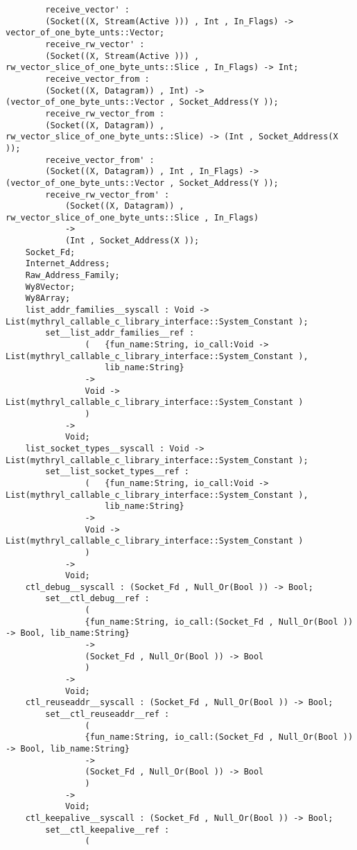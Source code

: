 \begin{verbatim}
        receive_vector' :
        (Socket((X, Stream(Active ))) , Int , In_Flags) -> vector_of_one_byte_unts::Vector;
        receive_rw_vector' :
        (Socket((X, Stream(Active ))) , rw_vector_slice_of_one_byte_unts::Slice , In_Flags) -> Int;
        receive_vector_from :
        (Socket((X, Datagram)) , Int) -> (vector_of_one_byte_unts::Vector , Socket_Address(Y ));
        receive_rw_vector_from :
        (Socket((X, Datagram)) , rw_vector_slice_of_one_byte_unts::Slice) -> (Int , Socket_Address(X ));
        receive_vector_from' :
        (Socket((X, Datagram)) , Int , In_Flags) -> (vector_of_one_byte_unts::Vector , Socket_Address(Y ));
        receive_rw_vector_from' :
            (Socket((X, Datagram)) , rw_vector_slice_of_one_byte_unts::Slice , In_Flags)
            ->
            (Int , Socket_Address(X ));
    Socket_Fd;
    Internet_Address;
    Raw_Address_Family;
    Wy8Vector;
    Wy8Array;
    list_addr_families__syscall : Void -> List(mythryl_callable_c_library_interface::System_Constant );
        set__list_addr_families__ref :
                (   {fun_name:String, io_call:Void -> List(mythryl_callable_c_library_interface::System_Constant ),
                    lib_name:String}
                ->
                Void -> List(mythryl_callable_c_library_interface::System_Constant )
                )
            ->
            Void;
    list_socket_types__syscall : Void -> List(mythryl_callable_c_library_interface::System_Constant );
        set__list_socket_types__ref :
                (   {fun_name:String, io_call:Void -> List(mythryl_callable_c_library_interface::System_Constant ),
                    lib_name:String}
                ->
                Void -> List(mythryl_callable_c_library_interface::System_Constant )
                )
            ->
            Void;
    ctl_debug__syscall : (Socket_Fd , Null_Or(Bool )) -> Bool;
        set__ctl_debug__ref :
                (
                {fun_name:String, io_call:(Socket_Fd , Null_Or(Bool )) -> Bool, lib_name:String}
                ->
                (Socket_Fd , Null_Or(Bool )) -> Bool
                )
            ->
            Void;
    ctl_reuseaddr__syscall : (Socket_Fd , Null_Or(Bool )) -> Bool;
        set__ctl_reuseaddr__ref :
                (
                {fun_name:String, io_call:(Socket_Fd , Null_Or(Bool )) -> Bool, lib_name:String}
                ->
                (Socket_Fd , Null_Or(Bool )) -> Bool
                )
            ->
            Void;
    ctl_keepalive__syscall : (Socket_Fd , Null_Or(Bool )) -> Bool;
        set__ctl_keepalive__ref :
                (

\end{verbatim}
